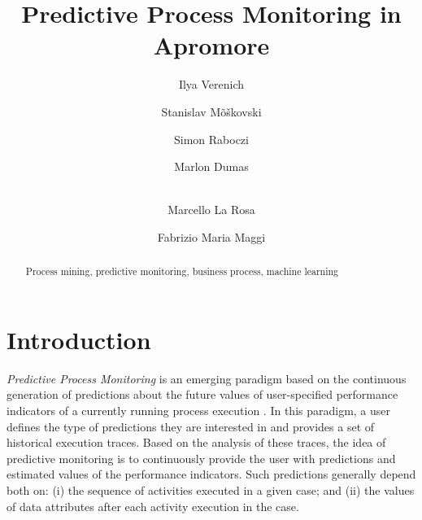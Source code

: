 \documentclass[runningheads,a4paper]{llncs}
\newcommand{\keywords}[1]{\par\addvspace\baselineskip
\noindent\keywordname\enspace\ignorespaces#1}
\begin{document}
\mainmatter  %

\title{Predictive Process Monitoring in Apromore}


%
%
\author{Ilya Verenich  \and Stanislav M\~{o}\v{s}kovski \and Simon Raboczi \and  Marlon Dumas  \and\\Marcello La Rosa \and Fabrizio Maria Maggi}


%
%

\maketitle


\begin{abstract}

\keywords{Process mining, predictive monitoring, business process, machine learning}
\end{abstract}


\section{Introduction} \label{sec:intro}
\emph{Predictive Process Monitoring} is an emerging paradigm based on the continuous generation of predictions about the future values of user-specified performance indicators of a currently running process execution \cite{PredictiveMonitoring}.
In this paradigm, a user defines the type of predictions they are interested in and provides a set of historical execution traces. Based on the analysis of these traces, the idea of predictive monitoring is to continuously provide the user with predictions and estimated values of the performance indicators. Such predictions generally depend both on: (i) the sequence of activities executed in a given case; and (ii) the values of data attributes after each activity execution in the case.
\end{document}
